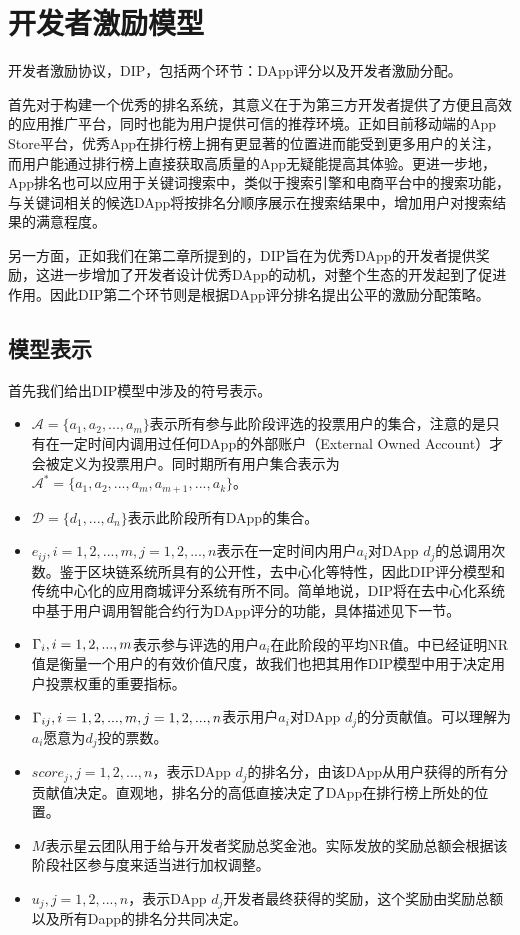 \section{开发者激励模型}
开发者激励协议，DIP，包括两个环节：DApp评分以及开发者激励分配。

首先对于构建一个优秀的排名系统，其意义在于为第三方开发者提供了方便且高效的应用推广平台，同时也能为用户提供可信的推荐环境。正如目前移动端的App Store平台，优秀App在排行榜上拥有更显著的位置进而能受到更多用户的关注，而用户能通过排行榜上直接获取高质量的App无疑能提高其体验。更进一步地，App排名也可以应用于关键词搜索中，类似于搜索引擎和电商平台中的搜索功能，与关键词相关的候选DApp将按排名分顺序展示在搜索结果中，增加用户对搜索结果的满意程度。

另一方面，正如我们在第二章所提到的，DIP旨在为优秀DApp的开发者提供奖励，这进一步增加了开发者设计优秀DApp的动机，对整个生态的开发起到了促进作用。因此DIP第二个环节则是根据DApp评分排名提出公平的激励分配策略。

\subsection{模型表示}
\label{subsection:parameters}
首先我们给出DIP模型中涉及的符号表示。
\begin{itemize}
	\item $\mathcal{A}=\{a_1,a_2,...,a_m\}$表示所有参与此阶段评选的投票用户的集合，注意的是只有在一定时间内调用过任何DApp的外部账户（External Owned Account）才会被定义为投票用户。同时期所有用户集合表示为$\mathcal{A}^*=\{a_1,a_2,...,a_m,a_{m+1},...,a_k\}$。
	\item $\mathcal{D}=\{d_1,...,d_n\}$表示此阶段所有DApp的集合。
	\item $e_{ij},i=1,2,...,m, j=1,2,...,n$表示在一定时间内用户$a_i$对DApp $d_j$的总调用次数。鉴于区块链系统所具有的公开性，去中心化等特性，因此DIP评分模型和传统中心化的应用商城评分系统有所不同。简单地说，DIP将在去中心化系统中基于用户调用智能合约行为DApp评分的功能，具体描述见下一节。
	\item $\Gamma_i, i=1,2,...,m$表示参与评选的用户$a_i$在此阶段的平均NR值。\cite{Nabulasyellowpaper}中已经证明NR值是衡量一个用户的有效价值尺度，故我们也把其用作DIP模型中用于决定用户投票权重的重要指标。
	\item $\Gamma_{ij}, i=1,2,...,m,j=1,2,...,n$表示用户$a_i$对DApp $d_j$的分贡献值。可以理解为$a_i$愿意为$d_j$投的票数。%
	\item $score_j, j=1,2,...,n$，表示DApp $d_j$的排名分，由该DApp从用户获得的所有分贡献值决定。直观地，排名分的高低直接决定了DApp在排行榜上所处的位置。%
	\item $M$表示星云团队用于给与开发者奖励总奖金池。实际发放的奖励总额会根据该阶段社区参与度来适当进行加权调整。
	\item $u_j, j=1,2,...,n$，表示DApp $d_j$开发者最终获得的奖励，这个奖励由奖励总额以及所有Dapp的排名分共同决定。%
\end{itemize}

